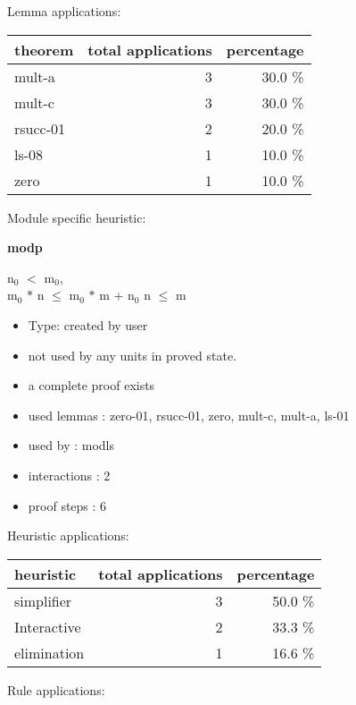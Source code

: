 \documentclass[a4paper]{article}
\begin{document}
Lemma applications:

\begin{supertabular}{l|r|r}
theorem	        & total applications & percentage \\ \hline
mult-a & 3 & 30.0 \% \\
mult-c & 3 & 30.0 \% \\
rsucc-01 & 2 & 20.0 \% \\
ls-08 & 1 & 10.0 \% \\
zero & 1 & 10.0 \% \\

\end{supertabular}

Module specific heuristic:

\pagebreak

{\LARGE\bf modp}\label{lemma-modp}

\medskip

$\mbox{n}_{0}$ $<$ $\mbox{m}_{0}$, \\
$\mbox{m}_{0}$ $*$ n $\le$ $\mbox{m}_{0}$ $*$ m + $\mbox{n}_{0}$ \Fol n $\le$ m

\begin{itemize}

\item Type: created by user

\item not used by any units in proved state.
\item       a complete proof exists
\item       used lemmas  : zero-01, rsucc-01, zero, mult-c, mult-a, ls-01
\item       used by      : modls
\item       interactions : 2
\item       proof steps  : 6
\end{itemize}

\medskip


Heuristic applications:

\begin{supertabular}{l|r|r}
heuristic	& total applications & percentage \\ \hline
simplifier & 3 & 50.0 \% \\
Interactive & 2 & 33.3 \% \\
elimination & 1 & 16.6 \% \\

\end{supertabular}

Rule applications:
\end{document}
